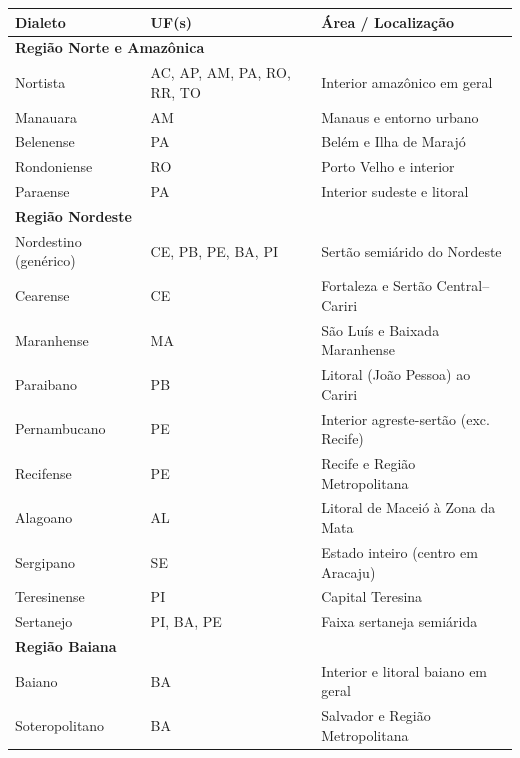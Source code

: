 \begin{table}[ht]
\centering
\tiny
\setlength{\tabcolsep}{6pt}
\begin{tabular}{lll}
\hline
\textbf{Dialeto} & \textbf{UF(s)} & \textbf{Área / Localização} \\
\hline
\multicolumn{3}{l}{

\textbf{Região Norte e Amazônica}} \\ \hline
Nortista    & AC, AP, AM, PA, RO, RR, TO & Interior amazônico em geral \\
Manauara    & AM                         & Manaus e entorno urbano     \\
Belenense   & PA                         & Belém e Ilha de Marajó      \\
Rondoniense & RO                         & Porto Velho e interior      \\
Paraense    & PA                         & Interior sudeste e litoral  \\
\hline
\multicolumn{3}{l}{\textbf{Região Nordeste}} \\ \hline
Nordestino (genérico) & CE, PB, PE, BA, PI & Sertão semiárido do Nordeste       \\
Cearense              & CE                  & Fortaleza e Sertão Central–Cariri  \\
Maranhense            & MA                  & São Luís e Baixada Maranhense     \\
Paraibano             & PB                  & Litoral (João Pessoa) ao Cariri    \\
Pernambucano          & PE                  & Interior agreste-sertão (exc. Recife) \\
Recifense             & PE                  & Recife e Região Metropolitana      \\
Alagoano              & AL                  & Litoral de Maceió à Zona da Mata   \\
Sergipano             & SE                  & Estado inteiro (centro em Aracaju) \\
Teresinense           & PI                  & Capital Teresina                   \\
Sertanejo             & PI, BA, PE          & Faixa sertaneja semiárida          \\
\hline
\multicolumn{3}{l}{\textbf{Região Baiana}} \\ \hline
Baiano          & BA & Interior e litoral baiano em geral      \\
Soteropolitano  & BA & Salvador e Região Metropolitana         \\

\end{tabular}
\end{table}

